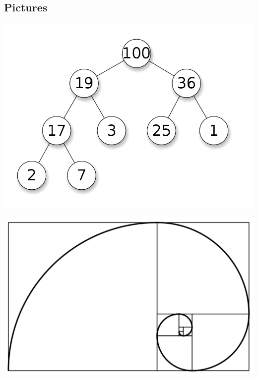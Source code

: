 \documentclass[letter,10pt]{article}
\begin{document}
\subsection{Pictures}
\begin{center}
\includegraphics{Max-Heap.png}
\end{center}
\begin{center}
\includegraphics{fibonacci.svg}
\end{center}


\newpage
\end{document}
